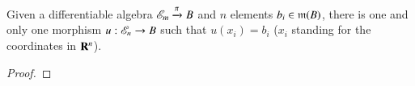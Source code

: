 \begin{proposition}\label{chap3-prop2.3}
Given a differentiable algebra $\mathscr{E}_{m}\xrightarrow{\pi}B$ and $n$ elements $b_{i}\in \mathfrak{m}(B)$, there is one and only one morphism $u:\mathscr{E}_{n}\to B$ such that $u(x_{i})=b_{i}$ ($x_{i}$ standing for the coordinates in $\mathbf{R}^{n}$).
\end{proposition}

\begin{proof}
\end{proof}

